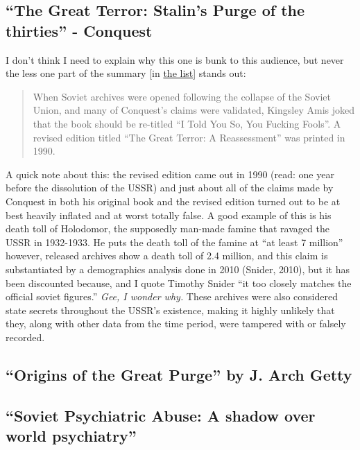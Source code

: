 \subsection{``The Great Terror: Stalin's Purge of the thirties'' - Conquest}
I don't think I need to explain why this one is bunk to this audience, but never the less one part of the summary [in \href{https://www.reddit.com/r/EnoughCommieSpam/wiki/anti_commie_resources}{the list}] stands out:
\begin{quote}
    When Soviet archives were opened following the collapse of the Soviet Union, and many of Conquest's claims were validated, Kingsley Amis joked that the book should be re-titled ``I Told You So, You Fucking Fools''.
    A revised edition titled ``The Great Terror: A Reassessment'' was printed in 1990.
\end{quote}
A quick note about this: the revised edition came out in 1990 (read: one year before the dissolution of the USSR) and just about all of the claims made by Conquest in both his original book and the revised edition turned out to be at best heavily inflated and at worst totally false.
A good example of this is his death toll of Holodomor, the supposedly man-made famine that ravaged the USSR in 1932-1933.
He puts the death toll of the famine at ``at least 7 million'' however, released archives show a death toll of 2.4 million, and this claim is substantiated by a demographics analysis done in 2010 (Snider, 2010), but it has been discounted because, and I quote Timothy Snider ``it too closely matches the official soviet figures.''
\emph{Gee, I wonder why.}
These archives were also considered state secrets throughout the USSR's existence, making it highly unlikely that they, along with other data from the time period, were tampered with or falsely recorded.

\subsection{``Origins of the Great Purge'' by J. Arch Getty}

\subsection{``Soviet Psychiatric Abuse: A shadow over world psychiatry''}

